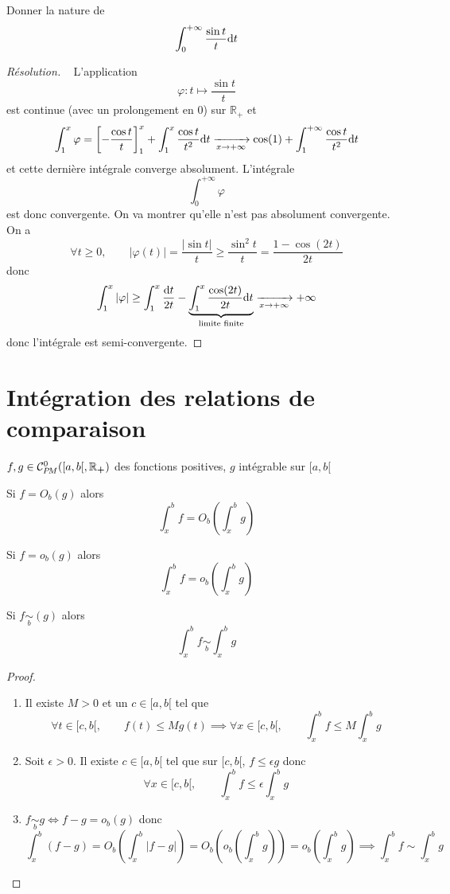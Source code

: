 \begin{exo}
    Donner la nature de \[
        \int_0^{+\infty}\frac{\sin t}t\mathrm{d} t
    \]
\end{exo}

\begin{proof}[Résolution]~
    L'application \[
        \varphi:t\longmapsto \frac{\sin t}t
    \]
    est continue (avec un prolongement en $0$) sur $\mathbb R_+$ et \[
        \int_1^x\varphi= \left[ -\frac{\cos t}t \right]_1^x+\int_1^x\frac{\cos t}{t^2}\mathrm{d} t\xrightarrow[x\to+\infty]{}\cos (1)+\int_1^{+\infty}\frac{\cos t}{t^2}\mathrm{d} t
    \]
    et cette dernière intégrale converge absolument. L'intégrale \[
        \int_0^{+\infty}\varphi
    \] est donc convergente.
    On va montrer qu'elle n'est pas absolument convergente. On a \[
        \forall t\geq 0, \qquad |\varphi(t)|= \frac{|\sin t|}t\geq \frac{\sin^2t}{t}=\frac{1-\cos(2t)}{2t}
    \]
    donc \[
        \int_1^x|\varphi|\geq \int_1^x\frac{\mathrm{d} t}{2t}-\underbrace{\int_1^x\frac{\cos(2t)}{2t}\mathrm{d} t}_{\text{limite finite}}\xrightarrow[x\to+\infty]{}+\infty
    \]
    donc l'intégrale est semi-convergente.
\end{proof}


\section{Intégration des relations de comparaison}

\needspace{3cm}
\begin{thm}
    \Hyp $f,g\in \CPM([a, b[, \mathbb R_{\bm+})$ des fonctions positives, $g$ intégrable sur $[a, b[$
    \begin{concenum}
    \item Si $f=O_b(g)$ alors \[
            \int_x^bf=O_b \left( \int_x^bg \right)
        \]
    \item Si $f=o_b(g)$ alors \[
            \int_x^bf=o_b \left( \int_x^bg \right)
        \]
    \item Si $f\underset b\sim(g)$ alors \[
            \int_x^bf\underset b\sim \int_x^bg
        \]
    \end{concenum}
\end{thm}

\begin{proof}~
    \begin{enumerate}
        \item Il existe $M>0$ et un $c\in[a, b[$ tel que \[
                \forall t\in [c, b[,\qquad  f(t)\leq Mg(t)\implies \forall x\in[c, b[, \qquad\int_x^bf\leq M\int_x^bg
            \]
        \item Soit $\epsilon>0$. Il existe $c\in [a, b[$ tel que sur $[c, b[$, $f\leq \epsilon g$ donc \[
                \forall x\in [c, b[, \qquad \int_x^bf\leq \epsilon\int_x^bg
            \]
        \item $f\underset b\sim g\iff f-g=o_b(g)$ donc \[
                \int_x^b(f-g)=O_b \left( \int_x^b|f-g| \right)=O_b \left( o_b \left( \int_x^bg \right) \right)=o_b \left( \int_x^b g \right)\implies \int_x^bf\sim\int_x^bg
            \]
    \end{enumerate}
\end{proof}

